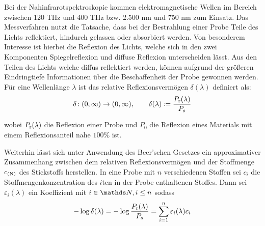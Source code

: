 		Bei der Nahinfrarotspektroskopie kommen elektromagnetische Wellen im Bereich zwischen 120 THz und 400 THz bzw. 2.500 nm und 750 nm zum Einsatz. \cite{Agelet2010}
		Das Messverfahren nutzt die Tatsache, dass bei der Bestrahlung einer Probe Teile des Lichts reflektiert, hindurch gelassen oder absorbiert werden.
		Von besonderem Interesse ist hierbei die Reflexion des Lichts, welche sich in den zwei Komponenten Spiegelreflexion und diffuse Reflexion unterscheiden lässt.
		Aus den Teilen des Lichts welche diffus reflektiert werden, können aufgrund der größeren Eindringtiefe Informationen über die Beschaffenheit der Probe gewonnen werden. \cite{Agelet2010}
		Für eine Wellenlänge $\lambda$ ist das relative Reflexionsvermögen $\delta(\lambda)$ definiert als:
		\[
			\delta\colon(0,\infty)\to(0,\infty),\qquad \delta(\lambda) \coloneqq \frac{P_{\mathrm{r}}(\lambda)}{P_s}
		\]

		wobei $P_{\mathrm{r}}(\lambda)$ die Reflexion einer Probe und $P_0$ die Reflexion eines Materials mit einem Reflexionsanteil nahe $100\%$ ist.

		Weiterhin lässt sich unter Anwendung des Beer'schen Gesetzes ein approximativer Zusammenhang zwischen dem relativen Reflexionsvermögen und der Stoffmenge $c_{\mathrm{(N)}}$ des Stickstoffs herstellen.
		In eine Probe mit $n$ verschiedenen Stoffen sei $c_i$ die Stoffmengenkonzentration des $i$ten in der Probe enthaltenen Stoffes.
		Dann sei $\varepsilon_i(\lambda)$ ein Koeffizient mit $i\in\SN,i\leq n$ sodass
		\[
			-\log \delta(\lambda) = -\log \frac{P_{\mathrm{r}}(\lambda)}{P_s} = \sum_{i=1}^{n} \varepsilon_i(\lambda) c_i
		\]



